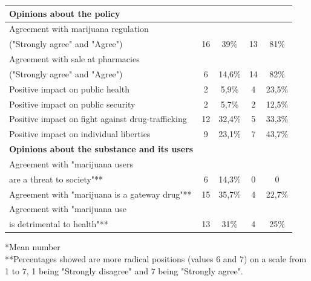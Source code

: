 \documentclass[11pt]{article}
\begin{document}
\begin{samepage}
\begin{table}
\begin{small}
\begin{tabular}{lcccc}
\textbf{Opinions about the policy}	&		&		&		&		\\	\hline
Agreement with marijuana regulation 	&		&		&		&		\\	
("Strongly agree" and "Agree")	&	16	&	39\%	&	13	&	81\% 	\\	
Agreement with sale at pharmacies	&		&		&		&		\\	
 ("Strongly agree" and "Agree")	&	6	&	14,6\%	&	14	&	82\%	\\	
Positive impact on public health 	&	2	&	5,9\%	&	4	&	23,5\%	\\	
Positive impact on public security 	&	2	&	5,7\%	&	2	&	12,5\%	\\	
Positive impact on fight against drug-trafficking	&	12	&	32,4\%	&	5	&	33,3\%	\\	
Positive impact on individual liberties	&	9	&	23,1\%	&	7	&	43,7\%	\\	\hline
\textbf{Opinions about the substance and its users}	&		&		&		&		\\	\hline
Agreement with "marijuana users	&		&		&		&		\\	
are a threat to society"**	&	6	&	14,3\%	&	0	&	0	\\	
Agreement with "marijuana is a gateway drug"**	&	15	&	35,7\%	&	4	&	22,7\%	\\	
Agreement with "marijuana use 	&		&		&		&		\\	
is detrimental to health"**	&	13	&	31\%	&	4	&	25\%	\\	\hline
\end{tabular}
\end{small}
\newline
\tiny{*Mean number \\
**Percentages showed are more radical positions (values 6 and 7) on a scale from 1 to 7, 1 being "Strongly disagree" and 7 being "Strongly agree".}
\end{table}
\end{samepage}
\end{document}
